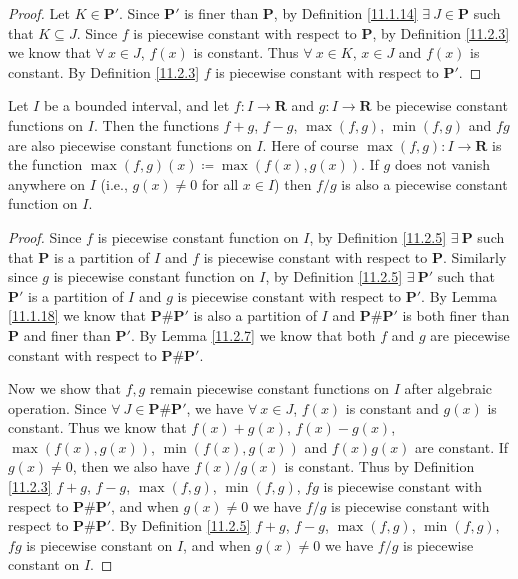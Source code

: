 \begin{proof}
    Let \(K \in \mathbf{P}'\).
    Since \(\mathbf{P}'\) is finer than \(\mathbf{P}\), by Definition \ref{11.1.14} \(\exists\ J \in \mathbf{P}\) such that \(K \subseteq J\).
    Since \(f\) is piecewise constant with respect to \(\mathbf{P}\), by Definition \ref{11.2.3} we know that \(\forall\ x \in J\), \(f(x)\) is constant.
    Thus \(\forall\ x \in K\), \(x \in J\) and \(f(x)\) is constant.
    By Definition \ref{11.2.3} \(f\) is piecewise constant with respect to \(\mathbf{P}'\).
\end{proof}

\begin{lemma}\label{11.2.8}
    Let \(I\) be a bounded interval, and let \(f : I \to \mathbf{R}\) and \(g : I \to \mathbf{R}\) be piecewise constant functions on \(I\).
    Then the functions \(f + g\), \(f - g\), \(\max(f, g)\), \(\min(f, g)\) and \(fg\) are also piecewise constant functions on \(I\).
    Here of course \(\max(f, g) : I \to \mathbf{R}\) is the function \(\max(f, g)(x) \coloneqq \max(f(x), g(x))\).
    If \(g\) does not vanish anywhere on \(I\) (i.e., \(g(x) \neq 0\) for all \(x \in I\)) then \(f / g\) is also a piecewise constant function on \(I\).
\end{lemma}

\begin{proof}
    Since \(f\) is piecewise constant function on \(I\), by Definition \ref{11.2.5} \(\exists\ \mathbf{P}\) such that \(\mathbf{P}\) is a partition of \(I\) and \(f\) is piecewise constant with respect to \(\mathbf{P}\).
    Similarly since \(g\) is piecewise constant function on \(I\), by Definition \ref{11.2.5} \(\exists\ \mathbf{P}'\) such that \(\mathbf{P}'\) is a partition of \(I\) and \(g\) is piecewise constant with respect to \(\mathbf{P}'\).
    By Lemma \ref{11.1.18} we know that \(\mathbf{P} \# \mathbf{P}'\) is also a partition of \(I\) and \(\mathbf{P} \# \mathbf{P}'\) is both finer than \(\mathbf{P}\) and finer than \(\mathbf{P}'\).
    By Lemma \ref{11.2.7} we know that both \(f\) and \(g\) are piecewise constant with respect to \(\mathbf{P} \# \mathbf{P}'\).

    Now we show that \(f, g\) remain piecewise constant functions on \(I\) after algebraic operation.
    Since \(\forall\ J \in \mathbf{P} \# \mathbf{P}'\), we have \(\forall\ x \in J\), \(f(x)\) is constant and \(g(x)\) is constant.
    Thus we know that \(f(x) + g(x)\), \(f(x) - g(x)\), \(\max(f(x), g(x))\), \(\min(f(x), g(x))\) and \(f(x) g(x)\) are constant.
    If \(g(x) \neq 0\), then we also have \(f(x) / g(x)\) is constant.
    Thus by Definition \ref{11.2.3} \(f + g\), \(f - g\), \(\max(f, g)\), \(\min(f, g)\), \(fg\) is piecewise constant with respect to \(\mathbf{P} \# \mathbf{P}'\), and when \(g(x) \neq 0\) we have \(f / g\) is piecewise constant with respect to \(\mathbf{P} \# \mathbf{P}'\).
    By Definition \ref{11.2.5} \(f + g\), \(f - g\), \(\max(f, g)\), \(\min(f, g)\), \(fg\) is piecewise constant on \(I\), and when \(g(x) \neq 0\) we have \(f / g\) is piecewise constant on \(I\).
\end{proof}


